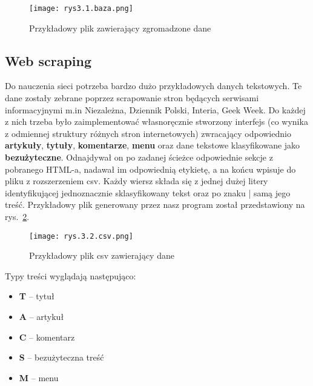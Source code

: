 \begin{figure}[h]
    \centering
    \texttt{[image: rys3.1.baza.png]}
    \caption{Przykładowy plik zawierający zgromadzone dane}
    \label{fig:3.1}
\end{figure}

\subsection{Web scraping}
\label{sec:3.1.1}

Do nauczenia sieci potrzeba bardzo dużo przykładowych danych tekstowych. Te dane zostały zebrane poprzez scrapowanie stron będących serwisami informacyjnymi m.in Niezależna, Dziennik Polski, Interia, Geek Week. Do każdej z nich trzeba było zaimplementować własnoręcznie stworzony interfejs (co wynika z odmiennej struktury różnych stron internetowych) zwracający odpowiednio \textbf{artykuły}, \textbf{tytuły}, \textbf{komentarze}, \textbf{menu} oraz dane tekstowe klasyfikowane jako \textbf{bezużyteczne}. Odnajdywał on po zadanej ścieżce odpowiednie sekcje z pobranego HTML-a, nadawał im odpowiednią etykietę, a na końcu wpisuje do pliku z rozszerzeniem csv. Każdy wiersz składa się z jednej dużej litery identyfikującej jednoznacznie sklasyfikowany tekst oraz po znaku | samą jego treść. Przykładowy plik generowany przez nasz program został przedstawiony na rys.~\ref{fig:3.2}.
\begin{figure}[h]
    \centering
    \texttt{[image: rys.3.2.csv.png]}
    \caption{Przykładowy plik csv zawierający dane}
    \label{fig:3.2}
\end{figure}
Typy treści wyglądają następująco:
\begin{itemize}

\item[] \textbf{T} – tytuł
\item[] \textbf{A} – artykuł
\item[] \textbf{C} – komentarz
\item[]  \textbf{S} – bezużyteczna treść
\item[]  \textbf{M} – menu

\end{itemize}


